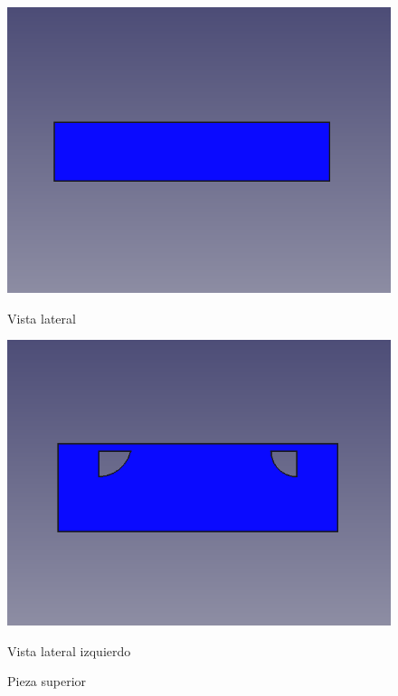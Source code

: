 \begin{figure}[ht!]
\begin{minipage}{0.45\linewidth}
		\includegraphics[width=\linewidth]{figs/cap5/superior3.png}
		\caption*{\centering Vista lateral}
	\end{minipage}
	\hspace{1cm}
	\begin{minipage}{0.45\linewidth}
		\centering
		\includegraphics[width=\linewidth]{figs/cap5/superior4.png}
		\caption*{\centering Vista lateral izquierdo}
	\end{minipage}
	
	\caption{Pieza superior}
	\label{fig:psuperior}
\end{figure}


